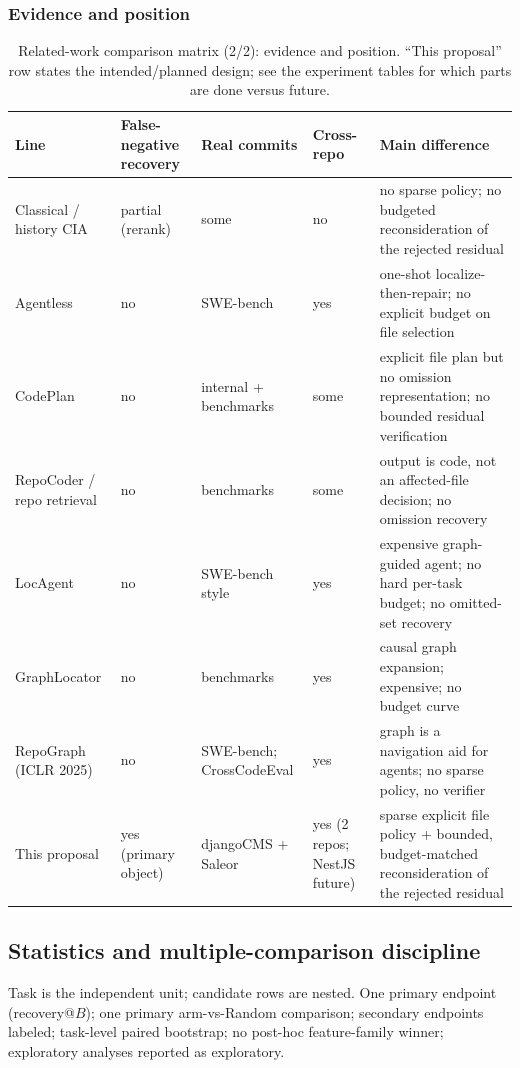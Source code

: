 \documentclass[11pt,a4paper]{article}
\begin{document}
\subsubsection{Evidence and position}
\begin{table}[h]
\centering
\footnotesize
\renewcommand{\arraystretch}{1.35}
\setlength{\tabcolsep}{1pt}
\begin{tabularx}{\textwidth}{@{}>{\raggedright\arraybackslash}p{2.2cm}>{\raggedright\arraybackslash}p{2.0cm}>{\raggedright\arraybackslash}p{1.7cm}>{\raggedright\arraybackslash}p{1.5cm}>{\raggedright\arraybackslash}X@{}}
\toprule
Line & False-negative recovery & Real commits & Cross-repo & Main difference \\
\midrule
Classical / history CIA & partial (rerank) & some & no & no sparse policy; no budgeted reconsideration of the rejected residual \\
Agentless & no & SWE-bench & yes & one-shot localize-then-repair; no explicit budget on file selection \\
CodePlan & no & internal + benchmarks & some & explicit file plan but no omission representation; no bounded residual verification \\
Repo\-Coder / repo retrieval & no & benchmarks & some & output is code, not an affected-file decision; no omission recovery \\
LocAgent & no & SWE-bench style & yes & expensive graph-guided agent; no hard per-task budget; no omitted-set recovery \\
Graph\-Locator & no & benchmarks & yes & causal graph expansion; expensive; no budget curve \\
Repo\-Graph (ICLR 2025) & no & SWE-bench; Cross\-CodeEval & yes & graph is a navigation aid for agents; no sparse policy, no verifier \\
This proposal & yes (primary object) & django\-CMS + Saleor & yes (2 repos; NestJS future) & sparse explicit file policy + bounded, budget-matched reconsideration of the rejected residual \\
\bottomrule
\end{tabularx}
\caption{Related-work comparison matrix (2/2): evidence and position. ``This proposal'' row states the intended/planned design; see the experiment tables for which parts are done versus future.}
\end{table}

\subsection{Statistics and multiple-comparison discipline}
Task is the independent unit; candidate rows are nested. One primary endpoint
(recovery@$B$); one primary arm-vs-Random comparison; secondary endpoints
labeled; task-level paired bootstrap; no post-hoc feature-family winner;
exploratory analyses reported as exploratory.
\end{document}
